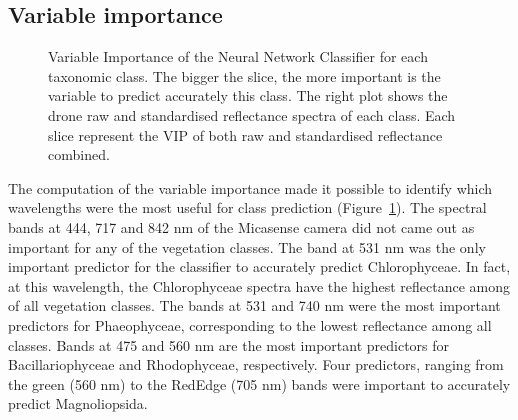 \documentclass[
  number]{elsarticle}
\begin{document}
\subsection{Variable importance}\label{variable-importance}

\label{cell-fig-VIP}
\begin{figure}[H]


\caption{\label{fig-VIP}Variable Importance of the Neural Network
Classifier for each taxonomic class. The bigger the slice, the more
important is the variable to predict accurately this class. The right
plot shows the drone raw and standardised reflectance spectra of each
class. Each slice represent the VIP of both raw and standardised
reflectance combined.}

\end{figure}%

The computation of the variable importance made it possible to identify
which wavelengths were the most useful for class prediction
(Figure~\ref{fig-VIP}). The spectral bands at 444, 717 and 842 nm of the
Micasense camera did not came out as important for any of the vegetation
classes. The band at 531 nm was the only important predictor for the
classifier to accurately predict Chlorophyceae. In fact, at this
wavelength, the Chlorophyceae spectra have the highest reflectance among
of all vegetation classes. The bands at 531 and 740 nm were the most
important predictors for Phaeophyceae, corresponding to the lowest
reflectance among all classes. Bands at 475 and 560 nm are the most
important predictors for Bacillariophyceae and Rhodophyceae,
respectively. Four predictors, ranging from the green (560 nm) to the
RedEdge (705 nm) bands were important to accurately predict
Magnoliopsida.
\end{document}
